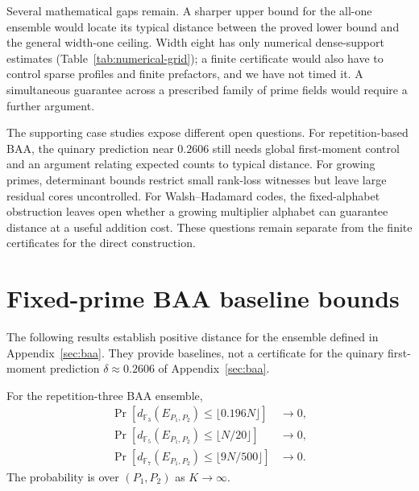 \documentclass[runningheads,envcountsame,envcountsect]{llncs}
\newcommand{\F}{\mathbb F}
\begin{document}
Several mathematical gaps remain. A sharper upper bound for the all-one
ensemble would locate its typical distance between the proved lower
bound and the general width-one ceiling. Width eight has only numerical
dense-support estimates (Table~\ref{tab:numerical-grid}); a finite
certificate would also have to control sparse profiles and finite
prefactors, and we have not timed it. A simultaneous guarantee across a
prescribed family of prime fields would require a further argument.

The supporting case studies expose different open questions. For
repetition-based BAA, the quinary prediction near $0.2606$ still needs
global first-moment control and an argument relating expected counts to
typical distance. For growing primes, determinant bounds restrict small
rank-loss witnesses but leave large residual cores uncontrolled.
For Walsh--Hadamard codes, the fixed-alphabet obstruction leaves open
whether a growing multiplier alphabet can guarantee distance at a useful
addition cost. These questions remain separate from the finite
certificates for the direct construction.




\appendix
\renewcommand{\theHsection}{\Alph{section}}



\section{Fixed-prime BAA baseline bounds}\label{app:fixed-prime}

The following results establish positive distance for the ensemble defined
in Appendix~\ref{sec:baa}.  They provide baselines, not a certificate for the
quinary first-moment prediction $\delta\approx0.2606$ of
Appendix~\ref{sec:baa}.

\begin{theorem}\label{thm:baa-fixed}
For the repetition-three BAA ensemble,
\begin{align*}
  \Pr[d_{\F_3}(E_{P_1,P_2})\le \lfloor 0.196N\rfloor]&\longrightarrow0,\\
  \Pr[d_{\F_5}(E_{P_1,P_2})\le \lfloor N/20\rfloor]&\longrightarrow0,\\
  \Pr[d_{\F_7}(E_{P_1,P_2})\le \lfloor 9N/500\rfloor]&\longrightarrow0.
\end{align*}
The probability is over $(P_1,P_2)$ as $K\to\infty$.
\end{theorem}
\end{document}
